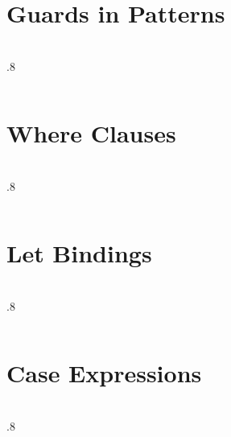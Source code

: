 \documentclass{beamer}
\newenvironment{codeblock}[1][.8]{%
\begin{columns}
\begin{column}{#1\linewidth}
\begin{exampleblock}{}}{%
\end{exampleblock}
\end{column}
\end{columns}}
\begin{document}
\section{Guards in Patterns}

\begin{frame}[fragile]
\frametitle{}

\begin{codeblock}
\begin{hcode}

\end{hcode}
\end{codeblock}

\end{frame}

\section{Where Clauses}


\begin{frame}[fragile]
\frametitle{}

\begin{codeblock}
\begin{hcode}

\end{hcode}
\end{codeblock}

\end{frame}


\section{Let Bindings}


\begin{frame}[fragile]
\frametitle{}

\begin{codeblock}
\begin{hcode}

\end{hcode}
\end{codeblock}

\end{frame}


\section{Case Expressions}


\begin{frame}[fragile]
\frametitle{}

\begin{codeblock}
\begin{hcode}

\end{hcode}
\end{codeblock}

\end{frame}
\end{document}
